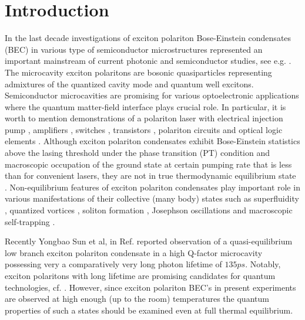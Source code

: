 \documentclass[aps, pre, preprint, groupedaddress, superscriptaddress, showkeys, showpacs] {revtex4-1}
\begin{document}
\pacs{\dots}
\keywords{\dots}

\maketitle

\newcommand{\sn}{\textrm{sn}}
\newcommand{\cn}{\textrm{cn}}
\newcommand{\dn}{\textrm{dn}}
\newcommand{\sd}{\textrm{sd}}
\newcommand{\cd}{\textrm{cd}}
\newcommand{\nd}{\textrm{nd}}
\newcommand{\am}{\textrm{am}}

\section{Introduction \label{sec:introduction}}

In the last decade investigations of exciton polariton Bose-Einstein condensates (BEC) in various type of semiconductor microstructures represented an important mainstream of current photonic and semiconductor studies, see e.g. \cite{Sanvitto, Guillet}.
The microcavity exciton polaritons are bosonic quasiparticles representing  admixtures of the quantized cavity mode and quantum well excitons.
Semiconductor microcavities are promising for various optoelectronic applications where the quantum  matter-field interface plays crucial role.
In particular, it is worth to mention demonstrations of a polariton laser with electrical injection pump \cite{Bhattacharya,Schneider}, amplifiers \cite{Niemietz}, switches \cite{Amo_2010}, transistors \cite{Ballarini}, polariton circuits and optical logic elements \cite{Sturm,Liew}.
Although exciton polariton condensates exhibit Bose-Einstein statistics  above the lasing threshold under the phase transition (PT) condition and macroscopic occupation of the ground state at certain pumping rate that is less than for convenient lasers, they are not in true thermodynamic equilibrium state \cite{Byrnes_2014,Sun}. Non-equilibrium features of exciton polariton condensates play important role in various manifestations of their collective (many body) states such as superfluidity \cite{Carusotto_2013,Amo_2009}, quantized vortices \cite{Lagoudakis_2008,Lagoudakis_2009}, soliton formation \cite{Sich}, Josephson oscillations and macroscopic self-trapping \cite{Abbarchi,Lagoudakis_2010}.

Recently Yongbao Sun et al, in Ref. \cite{Snoke_2017} reported observation of a quasi-equilibrium low branch exciton polariton condensate in a high Q-factor microcavity possessing very a comparatively very long photon lifetime of $135ps$. Notably, exciton polaritons with long lifetime are promising candidates for quantum technologies, cf. \cite{Demirchyan}. However, since exciton polariton BEC's in present experiments are observed at high enough (up to the room) temperatures the quantum properties of such a states should be examined even at full thermal equilibrium. 
    
\end{document}

